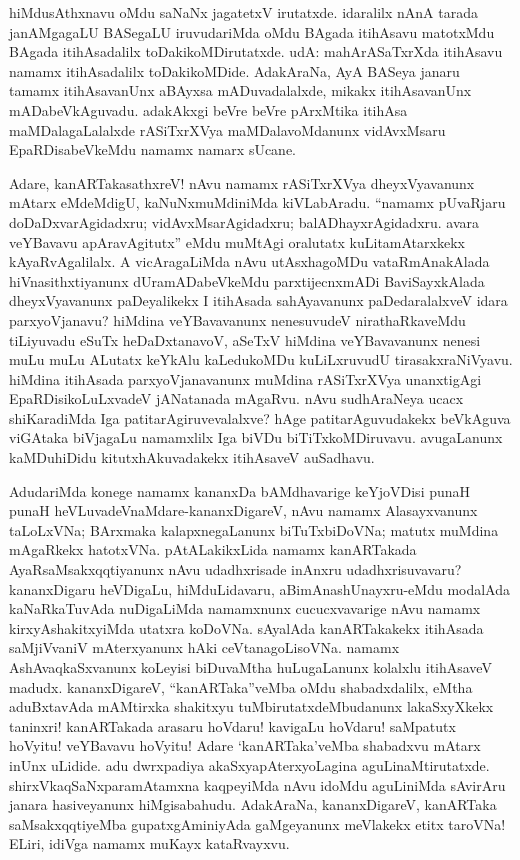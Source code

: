 \documentclass[11pt,a4size]{article}
\begin{document}
hiMdusAthxnavu oMdu saNaNx jagatetxV irutatxde. idaralilx nAnA tarada
janAMgagaLU BASegaLU iruvudariMda oMdu BAgada itihAsavu matotxMdu
BAgada itihAsadalilx toDakikoMDirutatxde. udA: mahArASaTxrXda
itihAsavu namamx itihAsadalilx toDakikoMDide. AdakAraNa, AyA BASeya
janaru tamamx itihAsavanUnx aBAyxsa mADuvadalalxde, mikakx
itihAsavanUnx mADabeVkAguvadu. adakAkxgi beVre beVre pArxMtika itihAsa
maMDalagaLalalxde rASiTxrXVya maMDalavoMdanunx vidAvxMsaru
EpaRDisabeVkeMdu namamx namarx sUcane.

Adare, kanARTakasathxreV! nAvu namamx rASiTxrXVya dheyxVyavanunx
mAtarx eMdeMdigU, kaNuNxmuMdiniMda kiVLabAradu. ``namamx pUvaRjaru
doDaDxvarAgidadxru; vidAvxMsarAgidadxru; balADhayxrAgidadxru. avara
veYBavavu apAravAgitutx'' eMdu muMtAgi oralutatx kuLitamAtarxkekx
kAyaRvAgalilalx. A vicAragaLiMda nAvu utAsxhagoMDu vataRmAnakAlada
hiVnasithxtiyanunx dUramADabeVkeMdu parxtijecnxmADi BaviSayxkAlada
dheyxVyavanunx paDeyalikekx I itihAsada sahAyavanunx paDedaralalxveV
idara parxyoVjanavu? hiMdina veYBavavanunx nenesuvudeV nirathaRkaveMdu
tiLiyuvadu eSuTx heDaDxtanavoV, aSeTxV hiMdina veYBavavanunx nenesi
muLu muLu ALutatx keYkAlu kaLedukoMDu kuLiLxruvudU
tirasakxraNiVyavu. hiMdina itihAsada parxyoVjanavanunx muMdina
rASiTxrXVya unanxtigAgi EpaRDisikoLuLxvadeV jANatanada mAgaRvu. nAvu
sudhAraNeya ucacx shiKaradiMda Iga patitarAgiruvevalalxve? hAge
patitarAguvudakekx beVkAguva viGAtaka biVjagaLu namamxlilx Iga biVDu
biTiTxkoMDiruvavu. avugaLanunx kaMDuhiDidu kitutxhAkuvadakekx
itihAsaveV auSadhavu.

AdudariMda konege namamx kananxDa bAMdhavarige keYjoVDisi punaH punaH
heVLuvadeVnaMdare-kananxDigareV, nAvu namamx Alasayxvanunx taLoLxVNa;
BArxmaka kalapxnegaLanunx biTuTxbiDoVNa; matutx muMdina mAgaRkekx
hatotxVNa. pAtALakikxLida namamx kanARTakada AyaRsaMsakxqqtiyanunx
nAvu udadhxrisade inAnxru udadhxrisuvavaru? kananxDigaru heVDigaLu,
hiMduLidavaru, aBimAnashUnayxru-eMdu modalAda kaNaRkaTuvAda
nuDigaLiMda namamxnunx cucucxvavarige nAvu namamx kirxyAshakitxyiMda
utatxra koDoVNa. sAyalAda kanARTakakekx itihAsada saMjiVvaniV
mAterxyanunx hAki ceVtanagoLisoVNa. namamx AshAvaqkaSxvanunx koLeyisi
biDuvaMtha huLugaLanunx kolalxlu itihAsaveV madudx. kananxDigareV,
``kanARTaka''veMba oMdu shabadxdalilx, eMtha aduBxtavAda mAMtirxka
shakitxyu tuMbirutatxdeMbudanunx lakaSxyXkekx taninxri! kanARTakada
arasaru hoVdaru! kavigaLu hoVdaru! saMpatutx hoVyitu! veYBavavu
hoVyitu! Adare `kanARTaka'veMba shabadxvu mAtarx inUnx uLidide. adu
dwrxpadiya akaSxyapAterxyoLagina
aguLinaMtirutatxde. shirxVkaqSaNxparamAtamxna kaqpeyiMda nAvu idoMdu
aguLiniMda sAvirAru janara hasiveyanunx hiMgisabahudu. AdakAraNa,
kananxDigareV, kanARTaka saMsakxqqtiyeMba gupatxgAminiyAda gaMgeyanunx
meVlakekx etitx taroVNa! ELiri, idiVga namamx muKayx kataRvayxvu.
\end{document}

